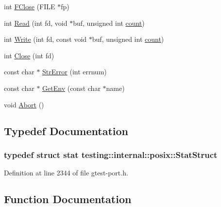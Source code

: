 \begin{DoxyCompactItemize}
\item 
int \hyperlink{namespacetesting_1_1internal_1_1posix_af4beeaaa8d62916d5e3b644a1ddfbd6b}{F\+Close} (F\+I\+LE $\ast$fp)
\item 
int \hyperlink{namespacetesting_1_1internal_1_1posix_a3c6ab13e581a56f1b02f3eb7536c97fd}{Read} (int fd, void $\ast$buf, unsigned int \hyperlink{gmock__stress__test_8cc_afd9db40e3361ae09188795e8cbe19752}{count})
\item 
int \hyperlink{namespacetesting_1_1internal_1_1posix_af4acf9f78d55f815a18b43786511abef}{Write} (int fd, const void $\ast$buf, unsigned int \hyperlink{gmock__stress__test_8cc_afd9db40e3361ae09188795e8cbe19752}{count})
\item 
int \hyperlink{namespacetesting_1_1internal_1_1posix_a15e5b8f2a535ef1b2529b85b861e4846}{Close} (int fd)
\item 
const char $\ast$ \hyperlink{namespacetesting_1_1internal_1_1posix_a4b77b14af6f4d18f83d303b98e9349c4}{Str\+Error} (int errnum)
\item 
const char $\ast$ \hyperlink{namespacetesting_1_1internal_1_1posix_a1d5e3da5a27eed25986859fa83cafe95}{Get\+Env} (const char $\ast$name)
\item 
void \hyperlink{namespacetesting_1_1internal_1_1posix_a69b8278c59359dd6a6f941b4643db9fb}{Abort} ()
\end{DoxyCompactItemize}


\subsection{Typedef Documentation}
\subsubsection[{\texorpdfstring{Stat\+Struct}{StatStruct}}]{\setlength{\rightskip}{0pt plus 5cm}typedef struct stat {\bf testing\+::internal\+::posix\+::\+Stat\+Struct}}\hypertarget{namespacetesting_1_1internal_1_1posix_a8eb9f08d3af29941c2d2a964cfff3ecb}{}\label{namespacetesting_1_1internal_1_1posix_a8eb9f08d3af29941c2d2a964cfff3ecb}


Definition at line 2344 of file gtest-\/port.\+h.



\subsection{Function Documentation}
